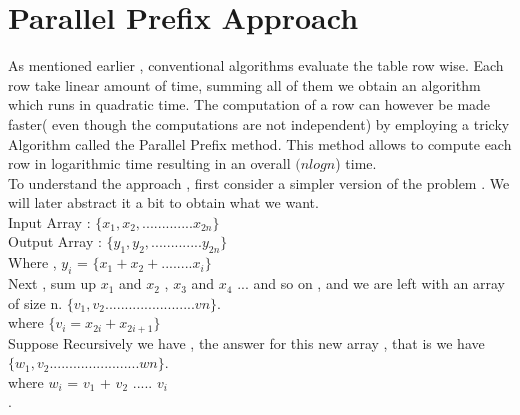 \documentclass[a4paper,11pt]{report}
\begin{document}
\section{Parallel Prefix Approach}
As mentioned earlier , conventional algorithms evaluate the table row wise. Each row take linear amount of time, summing all of them we obtain an algorithm which runs in quadratic time. The computation of a row can however be made faster( even though the computations are not independent) by employing a tricky Algorithm called the Parallel Prefix method. This method allows to compute each row in logarithmic time resulting in an overall 
$(nlogn$) time. \\

To understand the approach , first consider a simpler version of the problem . We will later abstract it a bit to obtain what we want. \\

Input Array :  $\{x_{1},x_{2},.............x_{2n}\}$  \\

Output Array :   $\{y_{1},y_{2},.............y_{2n}\}$ \\


Where , $y_{i}$  = $\{x_{1} + x_{2}+........  x_{i}\}$  \\


Next , sum up $x_{1}$ and $x_{2}$  , $x_{3}$ and $x_{4}$ ... and so on ,
and we are left with an array of size n.
 $\{v_{1},v_{2}.......................v{n}\}$. \\
 where $\{v_{i} = x_{2i} + x_{2i+1}\}$\\
 
 
 Suppose Recursively we have , the answer for this new array , that is we have  $\{w_{1},v_{2}.......................w{n}\}$. \\
 where  $w_{i}$ = $v_{1}$ + $v_{2}$ ..... $v_{i}$ \\.
 
\end{document}

